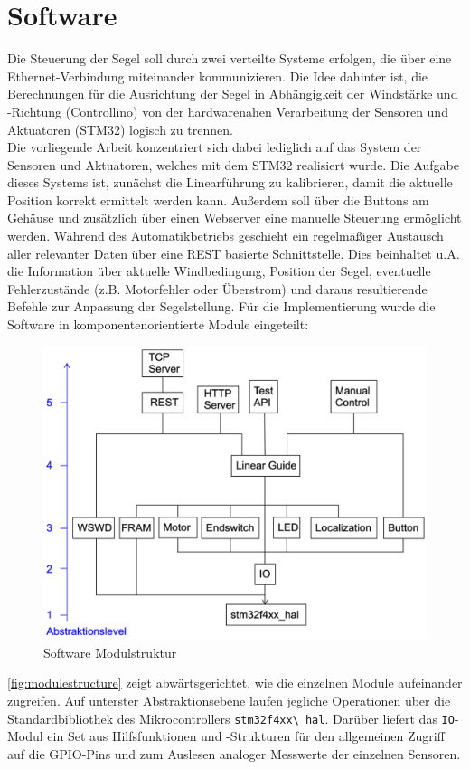 \section{Software}
Die Steuerung der Segel soll durch zwei verteilte Systeme erfolgen, die über eine Ethernet-Verbindung miteinander kommunizieren. Die Idee dahinter ist, die Berechnungen für die Ausrichtung der Segel in Abhängigkeit der Windstärke und -Richtung (Controllino) von der hardwarenahen Verarbeitung der Sensoren und Aktuatoren (STM32) logisch zu trennen. \\

\noindent
Die vorliegende Arbeit konzentriert sich dabei lediglich auf das System der Sensoren und Aktuatoren, welches mit dem STM32 realisiert wurde. Die Aufgabe dieses Systems ist, zunächst die Linearführung zu kalibrieren, damit die aktuelle Position korrekt ermittelt werden kann. Außerdem soll über die Buttons am Gehäuse und zusätzlich über einen Webserver eine manuelle Steuerung ermöglicht werden. Während des Automatikbetriebs geschieht ein regelmäßiger Austausch aller relevanter Daten über eine REST basierte Schnittstelle. Dies beinhaltet u.A. die Information über aktuelle Windbedingung, Position der Segel, eventuelle Fehlerzustände (z.B. Motorfehler oder Überstrom) und daraus resultierende Befehle zur Anpassung der Segelstellung.
Für die Implementierung wurde die Software in komponentenorientierte Module eingeteilt:
\begin{figure}[H]
	\centering
	\includegraphics[width=0.6\linewidth]{images/Software/Modulestructure.png}
	\caption{Software Modulstruktur}
	\label{fig:modulestructure}
\end{figure}
\noindent
\autoref{fig:modulestructure} zeigt abwärtsgerichtet, wie die einzelnen Module aufeinander zugreifen. Auf unterster Abstraktionsebene laufen jegliche Operationen über die Standardbibliothek des Mikrocontrollers \verb|stm32f4xx\_hal|. Darüber liefert das \verb|IO|-Modul ein Set aus Hilfsfunktionen und -Strukturen für den allgemeinen Zugriff auf die GPIO-Pins und zum Auslesen analoger Messwerte der einzelnen Sensoren.\\

